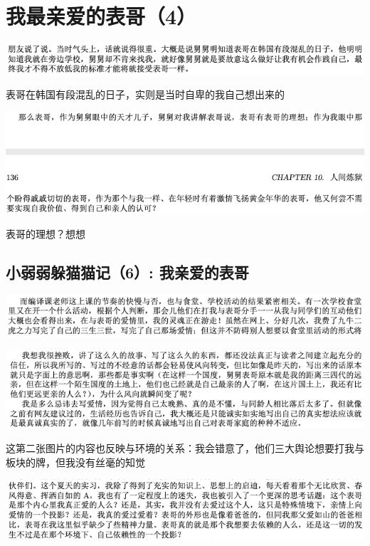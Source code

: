 \documentclass[9pt, b5paper]{article}
\begin{document}
\section{我最亲爱的表哥（4）}
\label{sec:orgee1d8e2}
\begin{center}
\includegraphics[width=.9\linewidth]{./pic/p1p49-3.png}
\end{center}
表哥在韩国有段混乱的日子，实则是当时自卑的我自己想出来的
\begin{center}
\includegraphics[width=.9\linewidth]{./pic/p1p135-05.png}
\end{center}
表哥的理想？想想
\subsection{小弱弱躲猫猫记（6）: 我亲爱的表哥}
\label{sec:orgee4ee61}

\begin{center}
\includegraphics[width=.9\linewidth]{./pic/backups_plans_20210422_075218.png}
\end{center}

\begin{center}
\includegraphics[width=.9\linewidth]{./pic/backups_plans_20210422_075500.png}
\end{center}
这第二张图片的内容也反映与环境的关系：我会错意了，他们三大舆论想要打我与板块的牌，但我没有丝毫的知觉

\begin{center}
\includegraphics[width=.9\linewidth]{./pic/backups_plans_20210422_075555.png}
\end{center}
\end{document}
